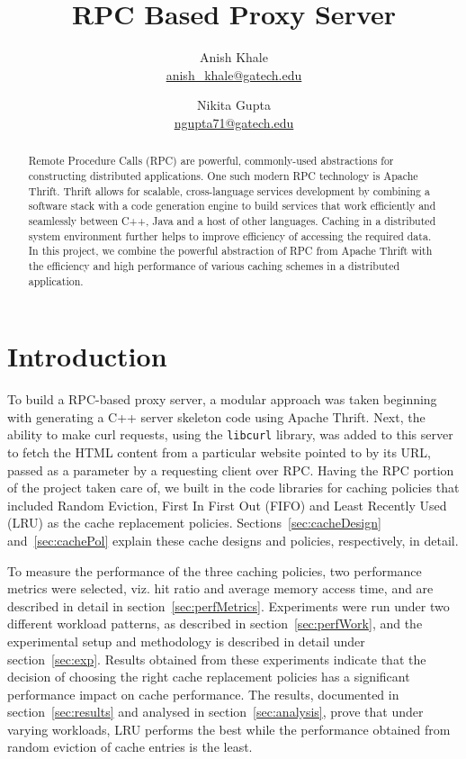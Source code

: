 \documentclass[11pt,pdftex,twocolumn]{article}
\title{RPC Based Proxy Server}
\author{
Anish Khale\\
\url{anish_khale@gatech.edu}
\and
Nikita Gupta\\
\url{ngupta71@gatech.edu}
}
\date{}
\begin{document}
\maketitle
\fancyfoot{}
\fancyfoot[C]{\thepage}
\thispagestyle{fancy}

\begin{abstract}
Remote Procedure Calls (RPC) are powerful, commonly-used abstractions for constructing distributed applications. One such modern RPC technology is Apache Thrift. Thrift allows for scalable, cross-language services development by combining a software stack with a code generation engine to build services that work efficiently and seamlessly between C++, Java and a host of other languages. Caching in a distributed system environment further helps to improve efficiency of accessing the required data. In this project, we combine the powerful abstraction of RPC from Apache Thrift with the efficiency and high performance of various caching schemes in a distributed application.
\end{abstract}

\section{Introduction}
To build a RPC-based proxy server, a modular approach was taken beginning with generating a C++ server skeleton code using Apache Thrift. Next, the ability to make curl requests, using the \texttt{libcurl} library, was added to this server to fetch the HTML content from a particular website pointed to by its URL, passed as a parameter by a requesting client over RPC. Having the RPC portion of the project taken care of, we built in the code libraries for caching policies that included Random Eviction, First In First Out (FIFO) and Least Recently Used (LRU) as the cache replacement policies. Sections~\ref{sec:cacheDesign} and~\ref{sec:cachePol} explain these cache designs and policies, respectively, in detail.

To measure the performance of the three caching policies, two performance metrics were selected, viz. hit ratio and average memory access time, and are described in detail in section~\ref{sec:perfMetrics}. Experiments were run under two different workload patterns, as described in section~\ref{sec:perfWork}, and the experimental setup and methodology is described in detail under section~\ref{sec:exp}. Results obtained from these experiments indicate that the decision of choosing the right cache replacement policies has a significant performance impact on cache performance. The results, documented in section~\ref{sec:results} and analysed in section~\ref{sec:analysis}, prove that under varying workloads, LRU performs the best while the performance obtained from random eviction of cache entries is the least.
\end{document}
